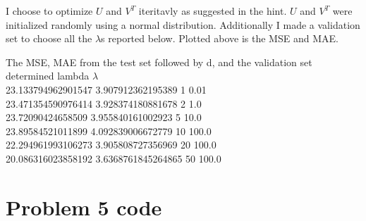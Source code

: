 \documentclass{article}
\newcommand{\1}{\mathbf{1}}
\begin{document}
I choose to optimize $U$ and $V^T$ iteritavly as suggested in the hint. $U$ and $V^T$ were initialized randomly using a normal distribution. Additionally I made a validation set to choose all the $\lambda$s reported below. Plotted above is the MSE and MAE. 


The MSE, MAE from the test set followed by d, and the validation set determined lambda $\lambda$ \\
23.133794962901547 3.907912362195389 1 0.01 \\
23.471354590976414 3.928374180881678 2 1.0 \\
23.72090424658509 3.955840161002923 5 10.0 \\
23.89584521011899 4.092839006672779 10 100.0 \\
22.294961993106273 3.905808727356969 20 100.0 \\
20.086316023858192 3.6368761845264865 50 100.0 \\



\section*{Problem 5 code}


\end{document}
